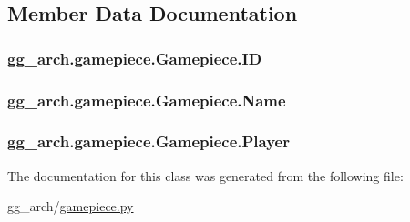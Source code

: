 \subsection{Member Data Documentation}
\hypertarget{classgg__arch_1_1gamepiece_1_1_gamepiece_a0b6d70910c3fa42cf5f77bf75970bd33}{
\subsubsection[{I\-D}]{\setlength{\rightskip}{0pt plus 5cm}gg\-\_\-arch.\-gamepiece.\-Gamepiece.\-I\-D}}\label{classgg__arch_1_1gamepiece_1_1_gamepiece_a0b6d70910c3fa42cf5f77bf75970bd33}
\hypertarget{classgg__arch_1_1gamepiece_1_1_gamepiece_ab5295c356db168e281cf094c405af757}{
\subsubsection[{Name}]{\setlength{\rightskip}{0pt plus 5cm}gg\-\_\-arch.\-gamepiece.\-Gamepiece.\-Name}}\label{classgg__arch_1_1gamepiece_1_1_gamepiece_ab5295c356db168e281cf094c405af757}
\hypertarget{classgg__arch_1_1gamepiece_1_1_gamepiece_a67d3c9e6c0512a4d6c06d301afe97563}{
\subsubsection[{Player}]{\setlength{\rightskip}{0pt plus 5cm}gg\-\_\-arch.\-gamepiece.\-Gamepiece.\-Player}}\label{classgg__arch_1_1gamepiece_1_1_gamepiece_a67d3c9e6c0512a4d6c06d301afe97563}


The documentation for this class was generated from the following file\-:\begin{DoxyCompactItemize}
\item 
gg\-\_\-arch/\hyperlink{gamepiece_8py}{gamepiece.\-py}\end{DoxyCompactItemize}
